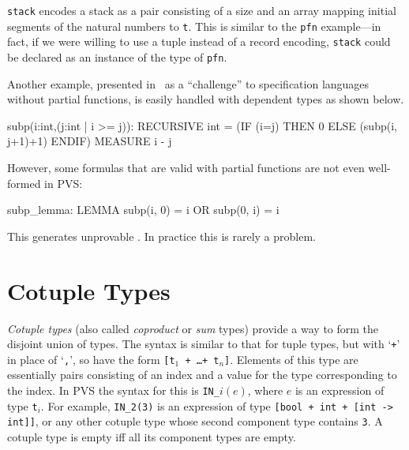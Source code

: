 \texttt{stack} encodes a stack as a pair consisting of a size and an array
mapping initial segments of the natural numbers to \texttt{t}.  This is
similar to the \texttt{pfn} example---in fact, if we were willing to use a
tuple instead of a record encoding, \texttt{stack} could be declared as an
instance of the type of \texttt{pfn}.

Another example, presented in~\cite{Cheng&Jones90} as a ``challenge'' to
specification languages without partial functions, is easily handled
with dependent types as shown below.
\begin{pvsex}
  subp(i:int,(j:int | i >= j)): RECURSIVE int =
       (IF (i=j) THEN 0 ELSE (subp(i, j+1)+1) ENDIF)
    MEASURE i - j
\end{pvsex}
However, some formulas that are valid with partial functions are not even
well-formed in PVS:
\begin{pvsex}
  subp_lemma: LEMMA subp(i, 0) = i OR subp(0, i) = i
\end{pvsex}
This generates unprovable \tccs.  In practice this is rarely a problem.

\section{Cotuple Types}\label{cotuple-types}

\emph{Cotuple types} (also called \emph{coproduct} or \emph{sum} types)
provide a way to form the disjoint union of types.  The syntax is similar
to that for tuple types, but with `\texttt{+}' in place of `\texttt{,}',
so have the form \texttt{[t$_1$ + \ldots + t$_n$]}.  Elements of this type
are essentially pairs consisting of an index and a value for the type
corresponding to the index.  In PVS the syntax for this is
\texttt{IN\_$i(e)$}, where $e$ is an expression of type \texttt{t$_i$}.
For example, \texttt{IN\_2(3)} is an expression of type \texttt{[bool + int
+ [int -> int]]}, or any other cotuple type whose second component type
contains \texttt{3}.  A cotuple type is empty iff all its component types
are empty.


